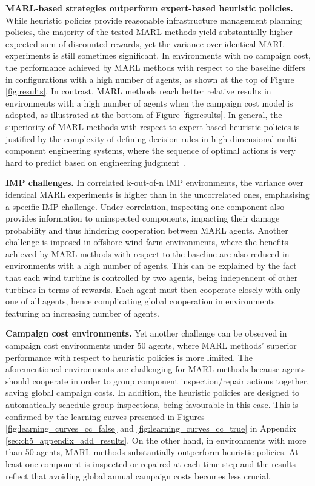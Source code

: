 \textbf{MARL-based strategies outperform expert-based heuristic policies.}
While heuristic policies provide reasonable infrastructure management planning policies, the majority of the tested MARL methods yield substantially higher expected sum of discounted rewards, yet the variance over identical MARL experiments is still sometimes significant.
In environments with no campaign cost, the performance achieved by MARL methods with respect to the baseline differs in configurations with a high number of agents, as shown at the top of Figure \ref{fig:results}.
In contrast, MARL methods reach better relative results in environments with a high number of agents when the campaign cost model is adopted, as illustrated at the bottom of Figure \ref{fig:results}. 
In general, the superiority of MARL methods with respect to expert-based heuristic policies is justified by the complexity of defining decision rules in high-dimensional multi-component engineering systems, where the sequence of optimal actions is very hard to predict based on engineering judgment~\citep{morato2022syst}.

\textbf{IMP challenges.}
In correlated k-out-of-n IMP environments, the variance over identical MARL experiments is higher than in the uncorrelated ones, emphasising a specific IMP challenge.
Under correlation, inspecting one component also provides information to uninspected components, impacting their damage probability and thus hindering cooperation between MARL agents.
Another challenge is imposed in offshore wind farm environments, where the benefits achieved by MARL methods with respect to the baseline are also reduced in environments with a high number of agents.
This can be explained by the fact that each wind turbine is controlled by two agents, being independent of other turbines in terms of rewards.
Each agent must then cooperate closely with only one of all agents, hence complicating global cooperation in environments featuring an increasing number of agents.

\textbf{Campaign cost environments.} Yet another challenge can be observed in campaign cost environments under 50 agents, where MARL methods' superior performance with respect to heuristic policies is more limited.
The aforementioned environments are challenging for MARL methods because agents should cooperate in order to group component inspection/repair actions together, saving global campaign costs.
In addition, the heuristic policies are designed to automatically schedule group inspections, being favourable in this case.
This is confirmed by the learning curves presented in Figures \ref{fig:learning_curves_cc_false} and \ref{fig:learning_curves_cc_true} in Appendix \ref{sec:ch5_appendix_add_results}.
On the other hand, in environments with more than 50 agents, MARL methods substantially outperform heuristic policies.
At least one component is inspected or repaired at each time step and the results reflect that avoiding global annual campaign costs becomes less crucial.

